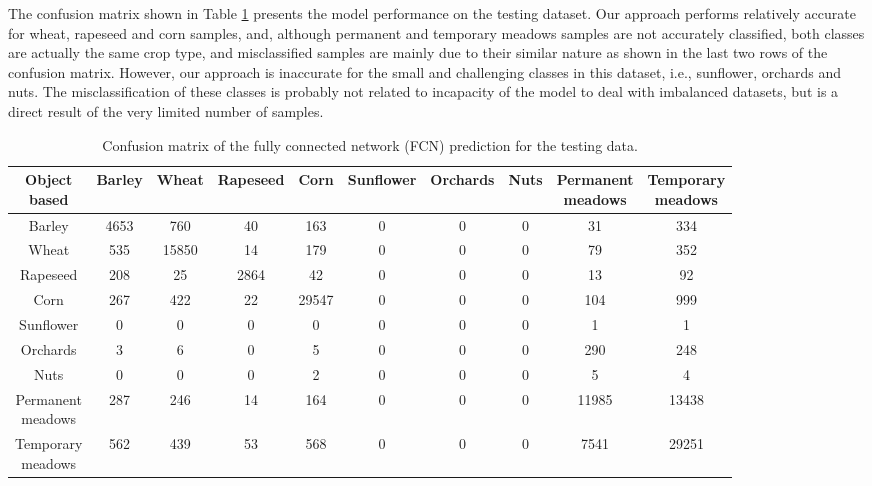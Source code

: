 \documentclass[journal,article,submit,pdftex,moreauthors]{Definitions/mdpi}
\begin{document}
The confusion matrix shown in Table \ref{confusion_matrix} presents the model performance on the testing dataset.
Our approach performs relatively accurate for wheat, rapeseed and corn samples, and, although permanent and temporary meadows samples are not accurately classified, both classes are actually the same crop type, and misclassified samples are mainly due to their similar nature as shown in the last two rows of the confusion matrix. However, our approach is inaccurate for the small and challenging classes in this dataset, i.e., sunflower, orchards and nuts. The misclassification of these classes is probably not related to incapacity of the model to deal with imbalanced datasets, but is a direct result of the very limited number of samples.
\begin{table}[H]
\centering
\scriptsize
\caption{Confusion matrix of the fully connected network (FCN) prediction for the testing data.}
\begin{tabular}{c|ccccccccc}
\hline
\makecell{Object\\based} & Barley & Wheat & Rapeseed & Corn & Sunflower & Orchards & Nuts & \makecell{Permanent\\meadows} & \makecell{Temporary\\meadows} \\ \hline
Barley      & 4653  & 760   & 40   & 163   & 0 & 0 & 0 & 31    & 334   \\
Wheat       & 535  & 15850 & 14   & 179   & 0 & 0 & 0 & 79   & 352   \\
Rapeseed    & 208   & 25    & 2864  & 42    & 0 & 0 & 0 & 13    & 92   \\
Corn        & 267   & 422   & 22  & 29547 & 0 & 0 & 0 & 104   & 999  \\
Sunflower   & 0     & 0 & 0 & 0 & 0 & 0 & 0 & 1 & 1 \\
Orchards    & 3     & 6 & 0 & 5 & 0 & 0 & 0 & 290   & 248   \\
Nuts        & 0     & 0 & 0 & 2 & 0 & 0 & 0 & 5 & 4 \\
\makecell{Permanent\\meadows}   & 287   & 246   & 14    & 164   & 0 & 0 & 0 & 11985 & 13438 \\
\makecell{Temporary\\meadows}   & 562   & 439   & 53    & 568   & 0 & 0 & 0 & 7541  & 29251 \\ 
\hline                  
\end{tabular}
\label{confusion_matrix}
\end{table}
\end{document}
